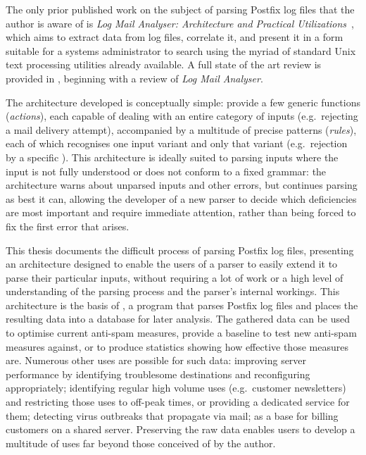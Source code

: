 The only prior published work on the subject of parsing Postfix log files
that the author is aware of is \textit{Log Mail Analyser: Architecture and
Practical Utilizations\/}~\cite{log-mail-analyser}, which aims to extract
data from log files, correlate it, and present it in a form suitable for a
systems administrator to search using the myriad of standard Unix text
processing utilities already available.  A full state of the art review is
provided in , beginning with a review
of \textit{Log Mail Analyser}.

The architecture developed is conceptually simple: provide a few generic
functions (\textit{actions\/}), each capable of dealing with an entire
category of inputs (e.g.\ rejecting a mail delivery attempt), accompanied
by a multitude of precise patterns (\textit{rules\/}), each of which
recognises one input variant and only that variant (e.g.\ rejection
by a specific ).  This architecture is ideally suited to
parsing inputs where the input is not fully understood or does not conform
to a fixed grammar: the architecture warns about unparsed inputs and other
errors, but continues parsing as best it can, allowing the developer of a
new parser to decide which deficiencies are most important and require
immediate attention, rather than being forced to fix the first error that
arises.

This thesis documents the difficult process of parsing Postfix log files,
presenting an architecture designed to enable the users of a parser to
easily extend it to parse their particular inputs, without requiring a lot
of work or a high level of understanding of the parsing process and the
parser's internal workings.  This architecture is the basis of
\parsername{}, a program that parses Postfix log files and places the
resulting data into a database for later analysis.  The gathered data can
be used to optimise current anti-spam measures, provide a baseline to test
new anti-spam measures against, or to produce statistics showing how
effective those measures are.  Numerous other uses are possible for such
data: improving server performance by identifying troublesome destinations
and reconfiguring appropriately; identifying regular high volume uses
(e.g.\ customer newsletters) and restricting those uses to off-peak times,
or providing a dedicated service for them; detecting virus outbreaks that
propagate via mail; as a base for billing customers on a shared server.
Preserving the raw data enables users to develop a multitude of uses far
beyond those conceived of by the author.

